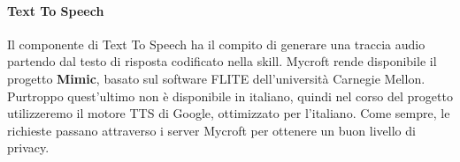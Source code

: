 \paragraph{Text To Speech} Il componente di Text To Speech ha il compito di generare una traccia audio partendo dal testo di risposta codificato nella skill. Mycroft rende disponibile il progetto \textbf{Mimic}, basato sul software FLITE dell'università Carnegie Mellon. Purtroppo quest'ultimo non è disponibile in italiano, quindi nel corso del progetto utilizzeremo il motore TTS di Google, ottimizzato per l'italiano. Come sempre, le richieste passano attraverso i server Mycroft per ottenere un buon livello di privacy.

